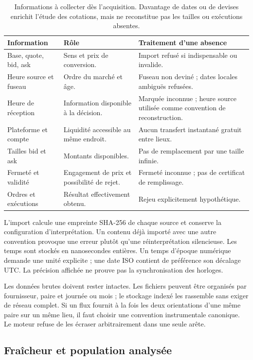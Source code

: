 \begin{table}[H]\centering\small
\begin{tabularx}{\linewidth}{@{}p{43mm}YY@{}}
\toprule
Information & Rôle & Traitement d'une absence\\
\midrule
Base, quote, bid, ask & Sens et prix de conversion. & Import refusé si indispensable ou invalide.\\
Heure source et fuseau & Ordre du marché et âge. & Fuseau non deviné ; dates locales ambiguës refusées.\\
Heure de réception & Information disponible à la décision. & Marquée inconnue ; heure source utilisée comme convention de reconstruction.\\
Plateforme et compte & Liquidité accessible au même endroit. & Aucun transfert instantané gratuit entre lieux.\\
Tailles bid et ask & Montants disponibles. & Pas de remplacement par une taille infinie.\\
Fermeté et validité & Engagement de prix et possibilité de rejet. & Fermeté inconnue ; pas de certificat de remplissage.\\
Ordres et exécutions & Résultat effectivement obtenu. & Rejeu explicitement hypothétique.\\
\bottomrule
\end{tabularx}
\caption{Informations à collecter dès l'acquisition. Davantage de dates ou de devises enrichit l'étude des cotations, mais ne reconstitue pas les tailles ou exécutions absentes.}
\end{table}

L'import calcule une empreinte SHA-256 de chaque source et conserve la configuration d'interprétation. Un contenu déjà importé avec une autre convention provoque une erreur plutôt qu'une réinterprétation silencieuse. Les temps sont stockés en nanosecondes entières. Un temps d'époque numérique demande une unité explicite ; une date ISO contient de préférence son décalage UTC. La précision affichée ne prouve pas la synchronisation des horloges.

Les données brutes doivent rester intactes. Les fichiers peuvent être organisés par fournisseur, paire et journée ou mois ; le stockage indexé les rassemble sans exiger de réseau complet. Si un flux fournit à la fois les deux orientations d'une même paire sur un même lieu, il faut choisir une convention instrumentale canonique. Le moteur refuse de les écraser arbitrairement dans une seule arête.

\subsection{Fraîcheur et population analysée}

